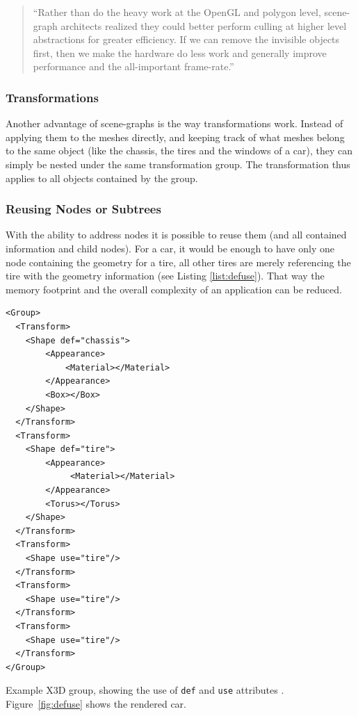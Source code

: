 \begin{quote}
  ``Rather than do the heavy work at the \gls{OpenGL} and polygon level,
  scene-graph architects realized they could better perform culling at
  higher level abstractions for greater efficiency. If we can remove the
  invisible objects first, then we make the hardware do less work and
  generally improve performance and the all-important frame-rate.'' \cite{realityprime}
\end{quote}

\subsubsection{Transformations}\label{transformations}

Another advantage of scene-graphs is the way transformations work. Instead of applying
them to the meshes directly, and keeping track of what meshes belong to
the same object (like the chassis, the tires and the windows of a
car), they can simply be nested under the same transformation group. The
transformation thus applies to all objects contained by the group.

\subsubsection{Reusing Nodes or Subtrees}\label{reuse}

With the ability to address nodes it is possible to reuse them (and all contained information and child nodes). For a car, it would be enough to have only one node
containing the geometry for a tire, all other tires are merely referencing
the tire with the geometry information (see Listing \ref{list:defuse}).
That way the memory footprint and the overall complexity of an application can be reduced.

\begin{listing}
  \begin{verbatim}
<Group>
  <Transform>
    <Shape def="chassis">
        <Appearance>
            <Material></Material>
        </Appearance>
        <Box></Box>
    </Shape>
  </Transform>
  <Transform>
    <Shape def="tire">
        <Appearance>
             <Material></Material>
        </Appearance>
        <Torus></Torus>
    </Shape>
  </Transform>
  <Transform>
    <Shape use="tire"/>
  </Transform>
  <Transform>
    <Shape use="tire"/>
  </Transform>
  <Transform>
    <Shape use="tire"/>
  </Transform>
</Group>
  \end{verbatim}
  \caption{Example \gls{X3D} group, showing the use of \texttt{def} and \texttt{use} attributes . Figure~\ref{fig:defuse} shows the rendered car.}
  \label{list:defuse}
\end{listing}

